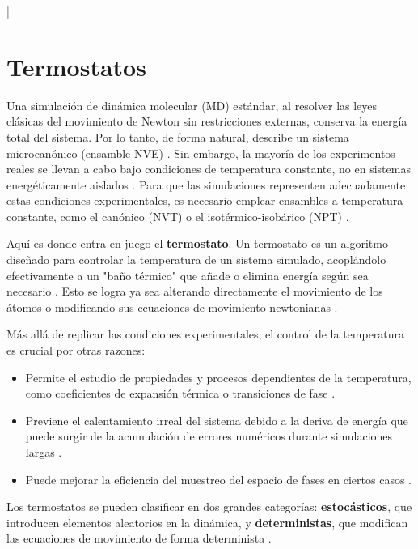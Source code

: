 
|\section{Termostatos}

Una simulación de dinámica molecular (MD) estándar, al resolver las leyes clásicas del movimiento de Newton sin restricciones externas, conserva la energía total del sistema. Por lo tanto, de forma natural, describe un sistema microcanónico (ensamble NVE) \cite[99]{zhou2022molecular}. Sin embargo, la mayoría de los experimentos reales se llevan a cabo bajo condiciones de temperatura constante, no en sistemas energéticamente aislados \cite[100]{zhou2022molecular}. Para que las simulaciones representen adecuadamente estas condiciones experimentales, es necesario emplear ensambles a temperatura constante, como el canónico (NVT) o el isotérmico-isobárico (NPT) \cite[100]{zhou2022molecular}.

Aquí es donde entra en juego el \textbf{termostato}. Un termostato es un algoritmo diseñado para controlar la temperatura de un sistema simulado, acoplándolo efectivamente a un "baño térmico" que añade o elimina energía según sea necesario \cite[100]{zhou2022molecular}. Esto se logra ya sea alterando directamente el movimiento de los átomos o modificando sus ecuaciones de movimiento newtonianas \cite[100]{zhou2022molecular}.

Más allá de replicar las condiciones experimentales, el control de la temperatura es crucial por otras razones:
\begin{itemize}
    \item Permite el estudio de propiedades y procesos dependientes de la temperatura, como coeficientes de expansión térmica o transiciones de fase \cite[100]{zhou2022molecular}.
    \item Previene el calentamiento irreal del sistema debido a la deriva de energía que puede surgir de la acumulación de errores numéricos durante simulaciones largas \cite[100]{zhou2022molecular}.
    \item Puede mejorar la eficiencia del muestreo del espacio de fases en ciertos casos \cite[100]{zhou2022molecular}.
\end{itemize}

Los termostatos se pueden clasificar en dos grandes categorías: \textbf{estocásticos}, que introducen elementos aleatorios en la dinámica, y \textbf{deterministas}, que modifican las ecuaciones de movimiento de forma determinista \cite[100]{zhou2022molecular}.

